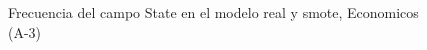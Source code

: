 \begin{figure}[H]
    \centering
    
    \caption{Frecuencia del campo State en el modelo real y smote, Economicos (A-3)}
    \label{frecuency-State-smote-enc}
\end{figure}